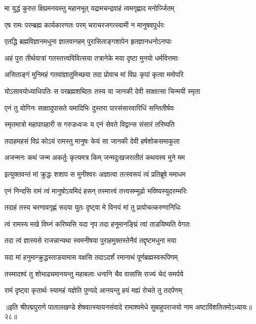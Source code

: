 \twolineshloka
{मा युद्धं कुरुत क्षिप्रमनयस्तु महानभूत्}
{यद्रामचन्द्रवाहं त्वमगृह्णाद मनोर्ज्जितम्}%

\twolineshloka
{एष रामः परम्ब्रह्म कार्यकारणतः परम्}
{चराचरजगत्स्वामी न मानुषवपुर्धरः}%

\twolineshloka
{एतद्धि ब्रह्मविज्ञानमधुना ज्ञातवानहम्}
{पुरासिताङ्गशापेन हृतज्ञानधनोऽनघाः}%

\twolineshloka
{अहं पुरा तीर्थयात्रां गतस्तत्त्वविवित्सया}
{तत्रानेके मया दृष्टा मुनयो धर्मवित्तमाः}%

\twolineshloka
{असिताङ्गं मुनिमहं गतवांज्ञातुमिच्छया}
{तदा प्रोवाच मां विप्रः कृपां कृत्वा ममोपरि}%

\twolineshloka
{योऽसावयोध्याधिपतिः स परब्रह्मशब्दितः}
{तस्य या जानकी देवी साक्षात्सा चिन्मयी स्मृता}%

\twolineshloka
{एनं तु योगिनः साक्षादुपासते यमादिभिः}
{दुस्तरा पारसंसारवारिधिं सन्तितीर्षवः}%

\twolineshloka
{स्मृतमात्रो महापापहारी स गरुडध्वजः}
{य एनं सेवते विद्वान्स संसारं तरिष्यति}%

\twolineshloka
{तदाहमहसं विप्रं कोऽयं रामस्तु मानुषः}
{केयं सा जानकी देवी हर्षशोकसमाकुला}%

\twolineshloka
{अजन्मनः कथं जन्म अकर्तुः कृत्यमत्र किम्}
{जन्मदुःखजरातीतं कथयस्व मुने मम}%

\twolineshloka
{इत्युक्तवन्तं मां क्रुद्धः शशाप स मुनीश्वरः}
{अज्ञात्वा तत्स्वरूपं त्वं प्रतिब्रूषे ममाधम}%

\twolineshloka
{एनं निन्दसि रामं त्वं मानुषोऽयमिदं हसन्}
{तस्मात्त्वं तत्त्वसम्मूढो भविष्यस्युदरम्भरिः}%

\twolineshloka
{तदाहं तस्य चरणावगृह्णं सदया युतः}
{दृष्ट्वा मे विनयं मां तु प्रावोचत्करुणानिधिः}%

\twolineshloka
{त्वं रामस्य मखे विघ्नं करिष्यसि यदा नृप}
{तदा हनूमानङ्घ्रिं त्वां ताडयिष्यति वेगतः}%

\twolineshloka
{तदा त्वं ज्ञास्यसे राजन्नान्यथा स्वमनीषया}
{पुराहमुक्तस्तेनैवं तद्दृष्टमधुना मया}%

\twolineshloka
{यदा मां हनुमान्क्रुद्धस्ताडयामास वक्षसि}
{तदाऽदर्शं रमानाथं पूर्णब्रह्मस्वरूपिणम्}%

\twolineshloka
{तस्मादश्वं तु शोभाढ्यमानयन्तु महाबलाः}
{धनानि चैव वासांसि राज्यं चेदं समर्पये}%

\twolineshloka
{रामं दृष्ट्वा कृतार्थः स्यामहं यज्ञेति पुण्यदे}
{आनयन्तु हयं मह्यं रोचते तु तदर्पणम्}%

{॥इति श्रीपद्मपुराणे पातालखण्डे शेषवात्स्यायनसंवादे रामाश्वमेधे सुबाहुपराजयो नाम अष्टाविंशतितमोऽध्यायः॥२८॥}

